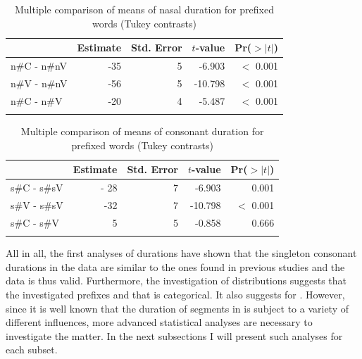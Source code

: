   \begin{table}
  	\caption{Multiple comparison of means of nasal duration for prefixed words (Tukey contrasts)}
  	\label{tbl:Tukey un}
  	
  		\begin{tabular} {lrrrr}
			
			
			\lsptoprule
  			& Estimate & Std. Error & $t$-value  & Pr($>$$|$$t$$|$)    \\
  			\midrule
  			n\#C - n\#nV  &-35  &  5 & -6.903 & $<$ 0.001\\
  			n\#V - n\#nV & -56 &  5 & -10.798 & $<$ 0.001\\
  			n\#C - n\#V  & -20 & 4 & -5.487 & $<$ 0.001 \\
  			\lspbottomrule                                                                                
		\end{tabular}
  	
  \end{table}
  
  
  
  \begin{table}
  	\caption{Multiple comparison of means of consonant duration for prefixed words (Tukey contrasts)}
  	\label{tbl:Tukey dis}
  	
  		\begin{tabular} {lrrrr}
			
			
			\lsptoprule
  			& Estimate & Std. Error & $t$-value  & Pr($>$$|$$t$$|$)    \\
  			\midrule
  			s\#C - s\#sV  &  - 28 &  7  & -6.903 & 0.001\\
  			s\#V - s\#sV & -32  &  7  & -10.798 &$<$ 0.001\\
  			s\#C - s\#V    &  {5}       &  5  &  -0.858  &  0.666  \\
  			  			\lspbottomrule                                                                                
		\end{tabular}

  	
  \end{table}
  
  

					

All in all, the first analyses of durations have shown that the singleton consonant durations in the data are similar to the ones found in previous studies and the data is thus valid. Furthermore, the investigation of distributions suggests that the investigated prefixes  and that  is categorical. It also suggests  for . 
However, since it is well known that the duration of segments in  is subject to a variety of different influences, more advanced statistical analyses are necessary to investigate the matter. In the next subsections I will present such analyses for each subset.



